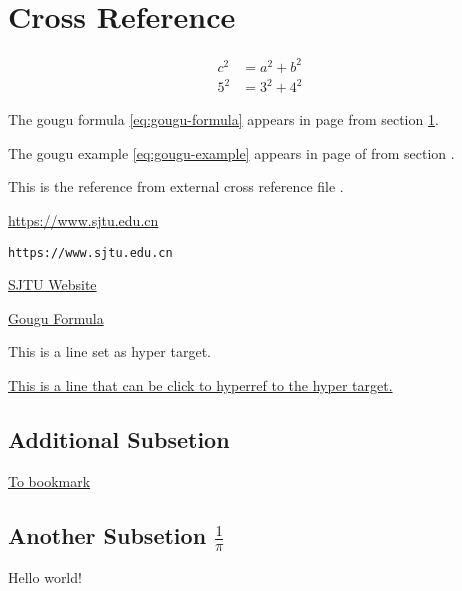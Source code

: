 \section{Cross Reference}
\label{sec:cross-ref}

\begin{align}
    c^2 &= a^2 + b^2
    \label{eq:gougu-formula} \\
    5^2 &= 3^2 + 4^2
    \label{eq:gougu-example}
\end{align}

The gougu formula \eqref{eq:gougu-formula} appears in                       %
\pageref{eq:gougu-formula} page from section \ref{sec:cross-ref}.

The gougu example \autoref{eq:gougu-example} appears in                     %
page \pageref{eq:gougu-formula} of \pageref{LastPage}                       %
from section .                                       %

This is the reference from external cross reference file .

\url{https://www.sjtu.edu.cn}       %

\nolinkurl{https://www.sjtu.edu.cn}     %


\href{https://www.sjtu.edu.cn}{SJTU Website}            %

\hyperref[eq:gougu-formula]{Gougu Formula}              %

\hypertarget{hpref:target}{This is a line set as hyper target.}     %

\hyperlink{hpref:target}{This is a line that can be click to hyperref to the hyper target.}     %

\subsection*{Additional Subsetion}

\hyperlink{subsec:additional-cross-ref}{To bookmark}    %

\subsection{Another Subsetion \texorpdfstring{$\frac{1}{\pi}$}{1/π}}                %
Hello world!